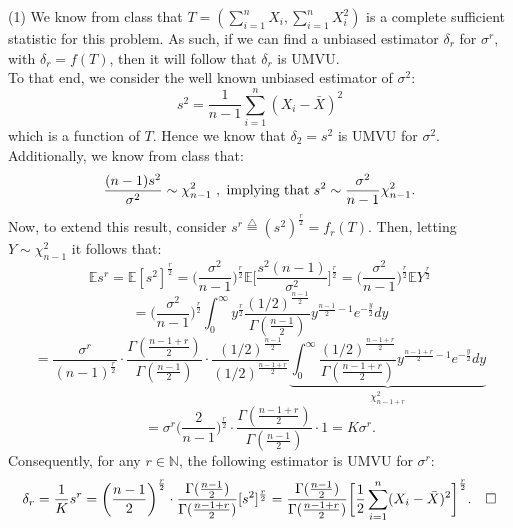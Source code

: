 \documentclass[12pt]{article}
\begin{document}

\def\ci{\perp\!\!\!\perp}
\def\ex{\mathbb{E}}
\def\prob{\mathbb{P}}
\def\ind{\mathbb{I}}
\def\grad{\triangledown}
\def\bigo{\mathcal{O}}


\noindent 
(1) We know from class that $T=(\sum_{i=1}^nX_i,\sum_{i=1}^n X_i^2)$ is a complete sufficient statistic for this problem. As such, if we can find a unbiased estimator $\delta_r$ for $\sigma^r$, with $\delta_r = f(T)$, then it will follow that $\delta_r$ is UMVU.\\
To that end, we consider the well known unbiased estimator of $\sigma^2$:
$$s^2 = \frac{1}{n-1} \sum\limits_{i=1}^n (X_i-\bar{X})^2$$
which is a function of $T$. Hence we know that $\delta_2 = s^2$ is UMVU for $\sigma^2$. Additionally, we know from class that:
$$ \frac{(n-1)s^2}{\sigma^2} \sim \chi_{n-1}^2
{\rm \hspace{3 pt}, \hspace{3 pt} implying \hspace{3 pt} that \hspace{3 pt}}s^2 \sim \frac{\sigma^2}{n-1}\chi_{n-1}^2.$$
Now, to extend this result, consider $s^r \overset{\triangle}= (s^2)^{\frac{r}{2}} = f_r(T)$. Then, letting $Y \sim \chi_{n-1}^2$ it follows that:
$$ \ex s^r = \ex [s^2]^{\frac{r}{2}} 
= \biggl(\frac{\sigma^2}{n-1}\biggr)^{\frac{r}{2}} \ex \biggl[\frac{s^2(n-1)}{\sigma^2}\biggr]^{\frac{r}{2}}
= \biggl(\frac{\sigma^2}{n-1}\biggr)^{\frac{r}{2}} \ex Y^{\frac{r}{2}}$$
$$= \biggl(\frac{\sigma^2}{n-1}\biggr)^{\frac{r}{2}} \int_0^\infty y^{\frac{r}{2}} \frac{(1/2)^{\frac{n-1}{2}}}{\Gamma(\frac{n-1}{2})}y^{\frac{n-1}{2}-1}e^{-\frac{y}{2}}dy$$
$$= \frac{\sigma^r}{(n-1)^{\frac{r}{2}}} \cdot \frac{\Gamma(\frac{n-1+r}{2})}{\Gamma(\frac{n-1}{2})} \cdot \frac{(1/2)^{\frac{n-1}{2}}}{(1/2)^{\frac{n-1+r}{2}}}
\underbrace{\int_0^\infty \frac{(1/2)^{\frac{n-1+r}{2}}}{\Gamma(\frac{n-1+r}{2})}y^{\frac{n-1+r}{2}-1}e^{-\frac{y}{2}}dy}_{\chi_{n-1+r}^2}$$
$$=\sigma^r \biggl(\frac{2}{n-1}\biggr)^{\frac{r}{2}} \cdot \frac{\Gamma(\frac{n-1+r}{2})}{\Gamma(\frac{n-1}{2})} \cdot 1
= K \sigma^r.$$
Consequently, for any $r\in\mathbb{N}$, the following estimator is UMVU for $\sigma^r$:
$$\delta_r = \frac{1}{K} s^r = \biggl(\frac{n-1}{2}\biggr)^{\frac{r}{2}} \cdot \frac{\Gamma(\frac{n-1}{2})}{\Gamma(\frac{n-1+r}{2})} [s^2]^{\frac{r}{2}}
= \frac{\Gamma(\frac{n-1}{2})}{\Gamma(\frac{n-1+r}{2})} 
\biggl[\frac{1}{2} \sum\limits_{i=1}^n (X_i-\bar{X})^2\biggr]^{\frac{r}{2}}. 
\hspace{10 pt} \square$$
\end{document}
